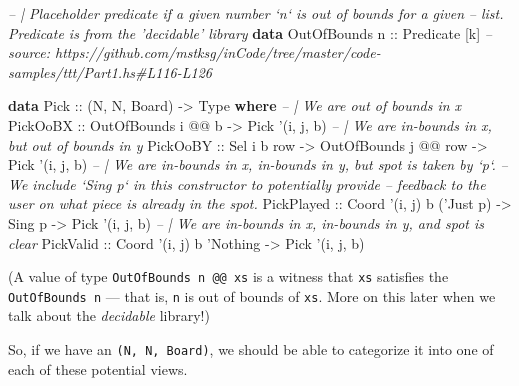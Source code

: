 \documentclass[]{article}
\newenvironment{Shaded}{}{}
\newcommand{\CommentTok}[1]{\textcolor[rgb]{0.38,0.63,0.69}{\textit{#1}}}
\newcommand{\DataTypeTok}[1]{\textcolor[rgb]{0.56,0.13,0.00}{#1}}
\newcommand{\FunctionTok}[1]{\textcolor[rgb]{0.02,0.16,0.49}{#1}}
\newcommand{\KeywordTok}[1]{\textcolor[rgb]{0.00,0.44,0.13}{\textbf{#1}}}
\newcommand{\NormalTok}[1]{#1}
\newcommand{\OtherTok}[1]{\textcolor[rgb]{0.00,0.44,0.13}{#1}}
\begin{document}
\begin{Shaded}
\begin{Highlighting}[]
\CommentTok{-- | Placeholder predicate if a given number `n` is out of bounds for a given}
\CommentTok{-- list.  Predicate is from the 'decidable' library}
\KeywordTok{data} \DataTypeTok{OutOfBounds}\OtherTok{ n ::} \DataTypeTok{Predicate}\NormalTok{ [k]}
\CommentTok{-- source: https://github.com/mstksg/inCode/tree/master/code-samples/ttt/Part1.hs#L116-L126}

\KeywordTok{data} \DataTypeTok{Pick}\OtherTok{ ::}\NormalTok{ (}\DataTypeTok{N}\NormalTok{, }\DataTypeTok{N}\NormalTok{, }\DataTypeTok{Board}\NormalTok{) }\OtherTok{->} \DataTypeTok{Type} \KeywordTok{where}
    \CommentTok{-- | We are out of bounds in x}
    \DataTypeTok{PickOoBX}\OtherTok{   ::} \DataTypeTok{OutOfBounds}\NormalTok{ i }\FunctionTok{@@}\NormalTok{ b                         }\OtherTok{->} \DataTypeTok{Pick}\NormalTok{ '(i, j, b)}
    \CommentTok{-- | We are in-bounds in x, but out of bounds in y}
    \DataTypeTok{PickOoBY}\OtherTok{   ::} \DataTypeTok{Sel}\NormalTok{ i b row        }\OtherTok{->} \DataTypeTok{OutOfBounds}\NormalTok{ j }\FunctionTok{@@}\NormalTok{ row }\OtherTok{->} \DataTypeTok{Pick}\NormalTok{ '(i, j, b)}
    \CommentTok{-- | We are in-bounds in x, in-bounds in y, but spot is taken by `p`.}
    \CommentTok{-- We include `Sing p` in this constructor to potentially provide}
    \CommentTok{-- feedback to the user on what piece is already in the spot.}
    \DataTypeTok{PickPlayed}\OtherTok{ ::} \DataTypeTok{Coord}\NormalTok{ '(i, j) b ('}\DataTypeTok{Just}\NormalTok{ p) }\OtherTok{->} \DataTypeTok{Sing}\NormalTok{ p        }\OtherTok{->} \DataTypeTok{Pick}\NormalTok{ '(i, j, b)}
    \CommentTok{-- | We are in-bounds in x, in-bounds in y, and spot is clear}
    \DataTypeTok{PickValid}\OtherTok{  ::} \DataTypeTok{Coord}\NormalTok{ '(i, j) b '}\DataTypeTok{Nothing}                   \OtherTok{->} \DataTypeTok{Pick}\NormalTok{ '(i, j, b)}
\end{Highlighting}
\end{Shaded}

(A value of type \texttt{OutOfBounds\ n\ @@\ xs} is a witness that \texttt{xs}
satisfies the \texttt{OutOfBounds\ n} --- that is, \texttt{n} is out of bounds
of \texttt{xs}. More on this later when we talk about the \emph{decidable}
library!)

So, if we have an \texttt{(N,\ N,\ Board)}, we should be able to categorize it
into one of each of these potential views.
\end{document}
